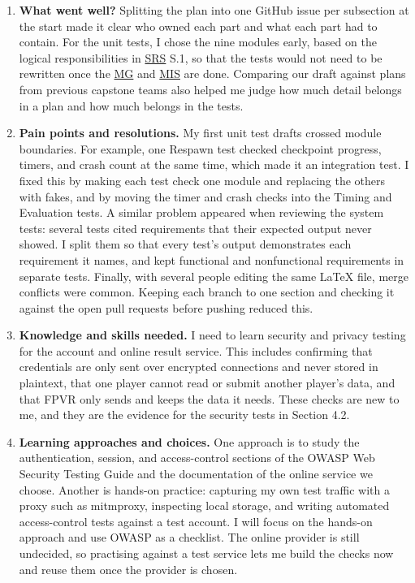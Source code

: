\documentclass[12pt, titlepage]{article}
\begin{document}
\begin{enumerate}
  \item \textbf{What went well?}
  Splitting the plan into one GitHub issue per subsection at the start made it
  clear who owned each part and what each part had to contain. For the unit tests,
  I chose the nine modules early, based on the logical responsibilities in \hyperlink{abbr:SRS}{SRS}
  S.1, so that the tests would not need to be rewritten once the \hyperlink{abbr:MG}{MG} and \hyperlink{abbr:MIS}{MIS} are
  done. Comparing our draft against plans from previous capstone teams also
  helped me judge how much detail belongs in a plan and how much belongs in the
  tests.

  \item \textbf{Pain points and resolutions.}
  My first unit test drafts crossed module boundaries. For example, one Respawn
  test checked checkpoint progress, timers, and crash count at the same time,
  which made it an integration test. I fixed this by making each test check one
  module and replacing the others with fakes, and by moving the timer and crash
  checks into the Timing and Evaluation tests. A similar problem appeared when
  reviewing the system tests: several tests cited requirements that their
  expected output never showed. I split them so that every test's output
  demonstrates each requirement it names, and kept functional and nonfunctional
  requirements in separate tests. Finally, with several people editing the same
  LaTeX file, merge conflicts were common. Keeping each branch to one section and
  checking it against the open pull requests before pushing reduced this.

  \item \textbf{Knowledge and skills needed.}
  I need to learn security and privacy testing for the account and online
  result service. This includes confirming that credentials are only sent over
  encrypted connections and never stored in plaintext, that one player cannot
  read or submit another player's data, and that FPVR only sends and keeps the
  data it needs. These checks are new to me, and they are the evidence for the
  security tests in Section 4.2.

  \item \textbf{Learning approaches and choices.}
  One approach is to study the authentication, session, and access-control
  sections of the OWASP Web Security Testing Guide and the documentation of the
  online service we choose. Another is hands-on practice: capturing my own test
  traffic with a proxy such as mitmproxy, inspecting local storage, and writing
  automated access-control tests against a test account. I will focus on the
  hands-on approach and use OWASP as a checklist. The online provider is still
  undecided, so practising against a test service lets me build the checks now
  and reuse them once the provider is chosen.
\end{enumerate}
\end{document}
